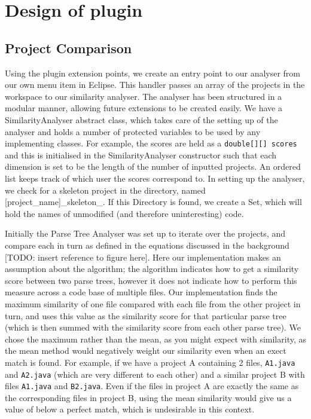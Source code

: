 \section{Design of plugin}

\subsection{Project Comparison}

Using the plugin extension points,
we create an entry point to our analyser from our own menu item in Eclipse. This
handler passes an array of the projects in the workspace to our similarity analyser.
The analyser has been structured in a modular manner, allowing future extensions
to be created easily. We have a SimilarityAnalyser abstract class, which takes
care of the setting up of the analyser and holds a number of protected variables
to be used by any implementing classes. For example, the scores are held as a
\texttt{double[][] scores} and this is initialised in the SimilarityAnalyser
constructor such that each dimension is set to be the length of the number of
inputted projects. An ordered list keeps track of which user the scores correspond
to. In setting up the analyser, we check for a skeleton project in the directory,
named [project\_name]\_skeleton\_. If this Directory is found, we create a Set,
which will hold the names of unmodified (and therefore uninteresting) code.

Initially the Parse Tree Analyser was set up to iterate over the projects, and
compare each in turn as defined in the equations discussed in the background [TODO:
insert reference to figure here]. Here our implementation makes an assumption about
the algorithm; the algorithm indicates how to get a similarity score between two 
parse trees, however it does not indicate how to perform this measure across a code
base of multiple files. Our implementation finds the maximum similarity of one file
compared with each file from the other project in turn, and uses this value as the
similarity score for that particular parse tree (which is then summed with the similarity
score from each other parse tree). We chose the maximum rather than the mean, as
you might expect with similarity, as the mean method would negatively weight our
similarity even when an exect match is found. For example, if we have a project A
containing 2 files, \texttt{A1.java} and \texttt{A2.java} (which are very different
 to each other) and a similar project B with files \texttt{A1.java} and \texttt{B2.java}.
Even if the files in project A are exactly the same as the corresponding files in
project B, using the mean similarity would give us a value of below a perfect match,
which is undesirable in this context.

